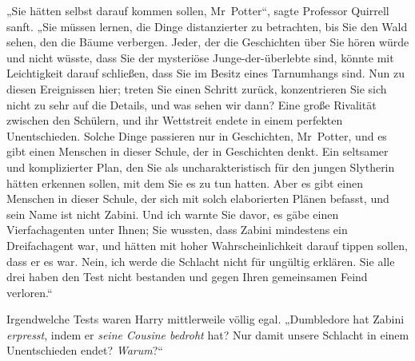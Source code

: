 „Sie hätten selbst darauf kommen sollen, Mr~Potter“, sagte Professor Quirrell sanft.
„Sie müssen lernen, die Dinge distanzierter zu betrachten, bis Sie den Wald sehen, den die Bäume verbergen. Jeder, der die Geschichten über Sie hören würde und nicht wüsste, dass Sie der mysteriöse Junge-der-überlebte sind, könnte mit Leichtigkeit darauf schließen, dass Sie im Besitz eines Tarnumhangs sind. Nun zu diesen Ereignissen hier; treten Sie einen Schritt zurück, konzentrieren Sie sich nicht zu sehr auf die Details, und was sehen wir dann? Eine große Rivalität zwischen den Schülern, und ihr Wettstreit endete in einem perfekten Unentschieden. Solche Dinge passieren nur in Geschichten, Mr~Potter, und es gibt einen Menschen in dieser Schule, der in Geschichten denkt. Ein seltsamer und komplizierter Plan, den Sie als uncharakteristisch für den jungen Slytherin hätten erkennen sollen, mit dem Sie es zu tun hatten. Aber es gibt einen Menschen in dieser Schule, der sich mit solch elaborierten Plänen befasst, und sein Name ist nicht Zabini. Und ich warnte Sie davor, es gäbe einen Vierfachagenten unter Ihnen; Sie wussten, dass Zabini mindestens ein Dreifachagent war, und hätten mit hoher Wahrscheinlichkeit darauf tippen sollen, dass er es war. Nein, ich werde die Schlacht nicht für ungültig erklären. Sie alle drei haben den Test nicht bestanden und gegen Ihren gemeinsamen Feind verloren.“

Irgendwelche Tests waren Harry mittlerweile völlig egal.
„Dumbledore hat Zabini \emph{erpresst}, indem er \emph{seine Cousine bedroht} hat? Nur damit unsere Schlacht in einem Unentschieden endet? \emph{Warum}?“

